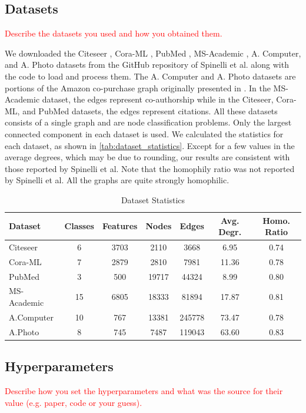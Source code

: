 \documentclass{gdl}
\begin{document}
\subsection{Datasets}
\textcolor{red}{Describe the datasets you used and how you obtained them. }

We downloaded the Citeseer \cite{sen2008}, Cora-ML \cite{mccallum2000}, PubMed \cite{namata2012}, MS-Academic \cite{shchur2018}, A. Computer, and A. Photo datasets from the GitHub repository of Spinelli et al. along with the code to load and process them. The A. Computer and A. Photo datasets are portions of the Amazon co-purchase graph originally presented in \cite{mcauley2015}. In the MS-Academic dataset, the edges represent co-authorship while in the Citeseer, Cora-ML, and PubMed datasets, the edges represent citations. All these datasets consists of a single graph and are node classification problems. Only the largest connected component in each dataset is used. We calculated the statistics for each dataset, as shown in \autoref{tab:dataset_statistics}. Except for a few values in the average degrees, which may be due to rounding, our results are consistent with those reported by Spinelli et al. Note that the homophily ratio was not reported by Spinelli et al. All the graphs are quite strongly homophilic.

\begin{table}[h]
    \footnotesize\sf
    \setlength{\tabcolsep}{1pt}
    \caption{Dataset Statistics}
    \begin{tabular}{l c c c c c c}
        \toprule
        Dataset & Classes & Features & Nodes & Edges & Avg. Degr. & Homo. Ratio \\
        \midrule
        Citeseer & 6 & 3703 & 2110 & 3668 & 6.95 & 0.74 \\
        Cora-ML & 7 & 2879 & 2810 & 7981 & 11.36 & 0.78 \\
        PubMed & 3 & 500 & 19717 &44324 &8.99 & 0.80 \\
        MS-Academic & 15&6805 & 18333 & 81894 & 17.87 & 0.81 \\
        A.Computer & 10 & 767 & 13381 & 245778 & 73.47 & 0.78 \\
        A.Photo  & 8 & 745 & 7487 & 119043 & 63.60 & 0.83 \\
        \bottomrule
    \end{tabular}
    \label{tab:dataset_statistics}
\end{table}

\subsection{Hyperparameters}
\textcolor{red}{Describe how you set the hyperparameters and what was the source for their value (e.g. paper, code or your guess). }
\end{document}
